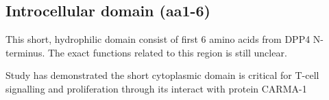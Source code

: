 \subsection{Introcellular domain (aa1-6)}

This short, hydrophilic domain consist of first 6 amino acids from DPP4 N-terminus. The exact functions related to this region is still unclear.

Study has demonstrated the short cytoplasmic domain is critical for T-cell signalling and proliferation through its interact with protein CARMA-1